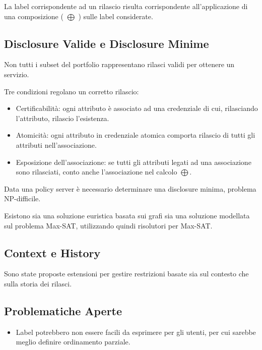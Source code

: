 La label corrispondente ad un rilascio risulta corrispondente all'applicazione di una composizione ( $\bigoplus$ ) sulle label considerate.



\subsection{Disclosure Valide e Disclosure Minime}
Non tutti i subset del portfolio rappresentano rilasci validi per ottenere un servizio.

Tre condizioni regolano un corretto rilascio:
\begin{itemize}
    \item Certificabilità: ogni attributo è associato ad una credenziale di cui, rilasciando l'attributo, rilascio l'esistenza.
    \item Atomicità: ogni attributo in credenziale atomica comporta rilascio di tutti gli attributi nell'associazione.
    \item Esposizione dell'associazione: se tutti gli attributi legati ad una associazione sono rilasciati, conto anche l'associazione nel calcolo $\bigoplus$.
\end{itemize}

Data una policy server è necessario determinare una disclosure minima, problema NP-difficile.

Esistono sia una soluzione euristica basata sui grafi sia una soluzione modellata sul problema Max-SAT, utilizzando quindi risolutori per Max-SAT.



\subsection{Context e History}
Sono state proposte estensioni per gestire restrizioni basate sia sul contesto che sulla storia dei rilasci.


\subsection{Problematiche Aperte}
\begin{itemize}
    \item Label potrebbero non essere facili da esprimere per gli utenti, per cui sarebbe meglio definire ordinamento parziale.
\end{itemize}








